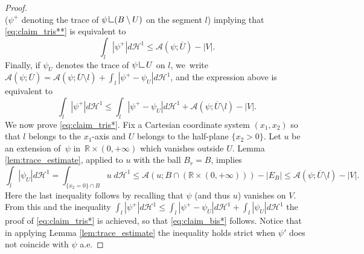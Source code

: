 \documentclass[JEP,XML,SOM,Unicode, NoFloatCountersInSection,published]{cedram}
\newcommand{\R}{\mathbb{R}}
\newcommand{\resa}{\mathop{\hbox{\vrule height 7pt width 0.5pt depth 0pt
\vrule height 0.5pt width 6pt depth 0pt}}\nolimits}
\newcommand{\resb}{\mathop{\hbox{\vrule height 4pt width 0.5pt depth 0pt
\vrule height 0.5pt width 3pt depth 0pt}}\nolimits}
\newcommand{\res}{\mathchoice{\resa}{\resa}{\resb}{\resb}}
\theoremstyle{definition}
\begin{document}
\begin{proof}
\[\]
($\psi^+$ denoting the trace of $\psi\res (B\setminus U)$ on the segment $l$) implying that \eqref{eq:claim_tris**} is equivalent to
\begin{equation*}
\int_l|{\psi}^+|d\mathcal H^1
\le\mathcal{A}(\psi;\overline U)-|V|.
\end{equation*}
Finally, if $\psi_U$ denotes the trace of $\psi\res U$ on $l$, we~write $\mathcal{A}(\psi;\overline U)=\mathcal{A}(\psi;\overline U\setminus l)+\int_l|\psi^+-\psi_U|d\mathcal H^1$, and the expression above is equivalent to
\begin{equation}\label{eq:claim_tris*}
\int_l|{\psi}^+|d\mathcal H^1
\le\int_l|\psi^+-\psi_U|d\mathcal H^1+\mathcal{A}(\psi;\overline U\setminus l)-|V|.
\end{equation}
We now prove \eqref{eq:claim_tris*}.
Fix a Cartesian coordinate system $(x_1,x_2)$ so that $l$ belongs to
the $x_1$-axis and $U$ belongs to the half-plane $\{x_2>0\}$. Let $u$ be an extension of~$\psi$ in~$\R\times(0,+\infty)$ which vanishes outside $U$.
Lemma \ref{lem:trace_estimate},
applied to $u$ with the ball $B_r=B$, implies
\[
 \int_l|{\psi}_U|d\mathcal H^1=\int_{\{x_2=0\}\cap B}u \;d\mathcal H^1\leq \mathcal A(u;B\cap (\R\times (0,+\infty)))-|E_B|\leq \mathcal A(\psi;\overline U\setminus l)-|V|.
\]
Here the last inequality follows by recalling that $\psi$ (and thus $u$) vanishes on $V$.
From this and the inequality $\int_l|{\psi}^+|d\mathcal H^1\leq \int_l|\psi^+-\psi_U|d\mathcal H^1+\int_l|{\psi}_U|d\mathcal H^1
$ the proof of \eqref{eq:claim_tris*} is achieved, so that \eqref{eq:claim_bis*} follows. Notice that in applying Lemma \ref{lem:trace_estimate} the inequality holds strict when $\psi'$ does not coincide with $\psi$ a.e.


\end{proof}
\end{document}
